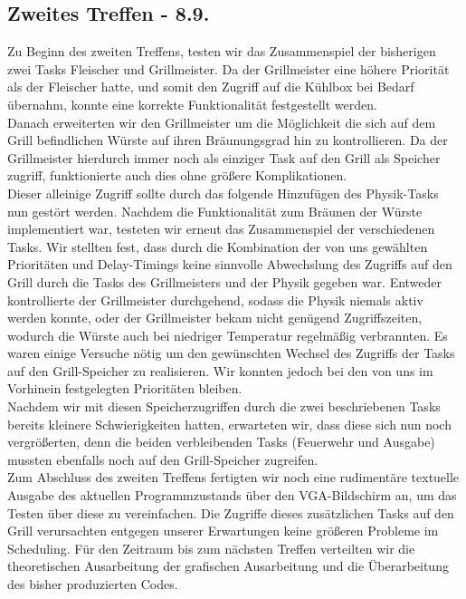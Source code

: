 \subsection{Zweites Treffen - 8.9.}

Zu Beginn des zweiten Treffens, testen wir das Zusammenspiel der bisherigen zwei Tasks Fleischer und Grillmeister. Da der Grillmeister eine höhere Priorität als der Fleischer hatte, und somit den Zugriff auf die Kühlbox bei Bedarf übernahm, konnte eine korrekte Funktionalität festgestellt werden.\\
Danach erweiterten wir den Grillmeister um die Möglichkeit die sich auf dem Grill befindlichen Würste auf ihren Bräunungsgrad hin zu kontrollieren. Da der Grillmeister hierdurch immer noch als einziger Task auf den Grill als Speicher zugriff, funktionierte auch dies ohne größere Komplikationen.\\

Dieser alleinige Zugriff sollte durch das folgende Hinzufügen des Physik-Tasks nun gestört werden. Nachdem die Funktionalität zum Bräunen der Würste implementiert war, testeten wir erneut das Zusammenspiel der verschiedenen Tasks. Wir stellten fest, dass durch die Kombination der von uns gewählten Prioritäten und Delay-Timings keine sinnvolle Abwechslung des Zugriffs auf den Grill durch die Tasks des Grillmeisters und der Physik gegeben war. Entweder kontrollierte der Grillmeister durchgehend, sodass die Physik niemals aktiv werden konnte, oder der Grillmeister bekam nicht genügend Zugriffszeiten, wodurch die Würste auch bei niedriger Temperatur regelmäßig verbrannten. Es waren einige Versuche nötig um den gewünschten Wechsel des Zugriffs der Tasks auf den Grill-Speicher zu realisieren. Wir konnten jedoch bei den von uns im Vorhinein festgelegten Prioritäten bleiben.\\

Nachdem wir mit diesen Speicherzugriffen durch die zwei beschriebenen Tasks bereits kleinere Schwierigkeiten hatten, erwarteten wir, dass diese sich nun noch vergrößerten, denn die beiden verbleibenden Tasks (Feuerwehr und Ausgabe) mussten ebenfalls noch auf den Grill-Speicher zugreifen.\\
Zum Abschluss des zweiten Treffens fertigten wir noch eine rudimentäre textuelle Ausgabe des aktuellen Programmzustands über den VGA-Bildschirm an, um das Testen über diese zu vereinfachen. Die Zugriffe dieses zusätzlichen Tasks auf den Grill verursachten entgegen unserer Erwartungen keine größeren Probleme im Scheduling. Für den Zeitraum bis zum nächsten Treffen verteilten wir die theoretischen Ausarbeitung der grafischen Ausarbeitung und die Überarbeitung des bisher produzierten Codes.

